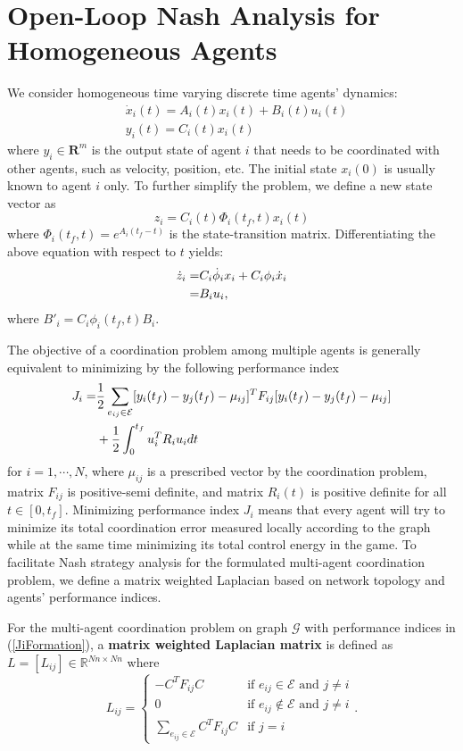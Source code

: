 \documentclass[10pt,doublecolumn]{IEEEtran}  %
\begin{document}
\section{Open-Loop Nash Analysis for Homogeneous Agents}
We consider homogeneous time varying discrete time agents' dynamics:
\begin{align*}
&\dot{x}_i(t)=A_i(t)x_i(t)+B_i(t)u_i(t)\\
&y_{i}(t)=C_i(t)x_i(t)
\end{align*}
where $y_i\in\mathbf{R}^m$ is the output state of agent $i$ that needs to be coordinated with other agents, such as velocity, position, etc. The initial state $x_i(0)$ is usually known to agent $i$ only. To further simplify the problem, we define a new state vector as
\begin{equation}
z_i=C_i(t)\Phi_i(t_f,t)x_i(t)\label{zi}
\end{equation}
where $\Phi_i(t_f,t)=e^{A_i(t_f-t)}$ is the state-transition matrix. Differentiating the above equation with
respect to $t$ yields:
\begin{align}
\dot{z}_i=&C_i\dot{\phi}_ix_i+C_i\phi_i\dot{x}_i \notag\\
=&B_iu_i ,\label{zidot}
\end{align}
where $B'_i=C_i\phi_i(t_f,t)B_i$.

The objective of a coordination problem among multiple agents is generally equivalent to minimizing by the following performance index
\begin{align}
J_i=&\frac{1}{2}\sum_{e_{ij}\in\mathcal{E}} [y_i(t_f)-y_j(t_f)-\mu_{ij}]^TF_{ij}[y_i(t_f)-y_j(t_f)-\mu_{ij}]\notag \\
&+\frac{1}{2}\int_{0}^{t_f} u_i^TR_iu_idt \label{JiFormation}
\end{align}
for $i=1,\cdots,N$, where $\mu_{ij}$ is a prescribed vector by the coordination problem, matrix $F_{ij}$ is positive-semi definite, and matrix $R_i(t)$ is positive definite for all $t\in[0,t_f]$. Minimizing performance index $J_i$ means that every agent will try to minimize its total coordination error measured locally according to the graph while at the same time minimizing its total control energy in the game. To facilitate Nash strategy analysis for the formulated multi-agent coordination problem, we define a matrix weighted Laplacian based on network topology and agents' performance indices.
\begin{Def}
For the multi-agent coordination problem on graph $\mathcal{G}$ with performance indices in (\ref{JiFormation}), a \textbf{matrix weighted Laplacian matrix} is defined as $L=[L_{ij}]\in\mathbb{R}^{Nn\times Nn}$ where
\begin{equation}
L_{ij}=\left\{\begin{array}{ll}
-C^TF_{ij}C&\mbox{if $e_{ij}\in\mathcal{E}$ and $j\neq i$}\\
0&\mbox{if $e_{ij}\notin\mathcal{E}$ and $j\neq i$}\\
\displaystyle \sum_{e_{ij}\in\mathcal{E}}C^TF_{ij}C&\mbox{if $j=i$}
\end{array}\right..\label{laplacian}
\end{equation}
\end{Def}
\end{document}
